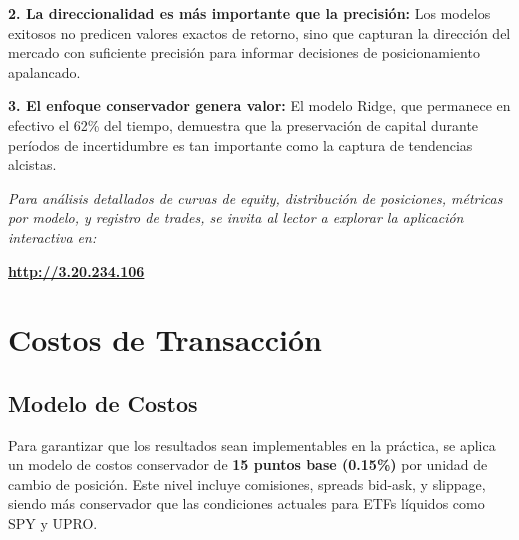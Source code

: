 \documentclass[11pt,a4paper]{article}
\begin{document}
\textbf{2. La direccionalidad es más importante que la precisión:} Los modelos exitosos no predicen valores exactos de retorno, sino que capturan la dirección del mercado con suficiente precisión para informar decisiones de posicionamiento apalancado.

\textbf{3. El enfoque conservador genera valor:} El modelo Ridge, que permanece en efectivo el 62\% del tiempo, demuestra que la preservación de capital durante períodos de incertidumbre es tan importante como la captura de tendencias alcistas.

\vspace{0.5cm}

\begin{center}
\textit{Para análisis detallados de curvas de equity, distribución de posiciones, métricas por modelo, y registro de trades, se invita al lector a explorar la aplicación interactiva en:}

\vspace{0.3cm}

\textbf{\url{http://3.20.234.106}}
\end{center}






\section{Costos de Transacción}

\subsection{Modelo de Costos}

Para garantizar que los resultados sean implementables en la práctica, se aplica un modelo de costos conservador de \textbf{15 puntos base (0.15\%)} por unidad de cambio de posición. Este nivel incluye comisiones, spreads bid-ask, y slippage, siendo más conservador que las condiciones actuales para ETFs líquidos como SPY y UPRO.
\end{document}
